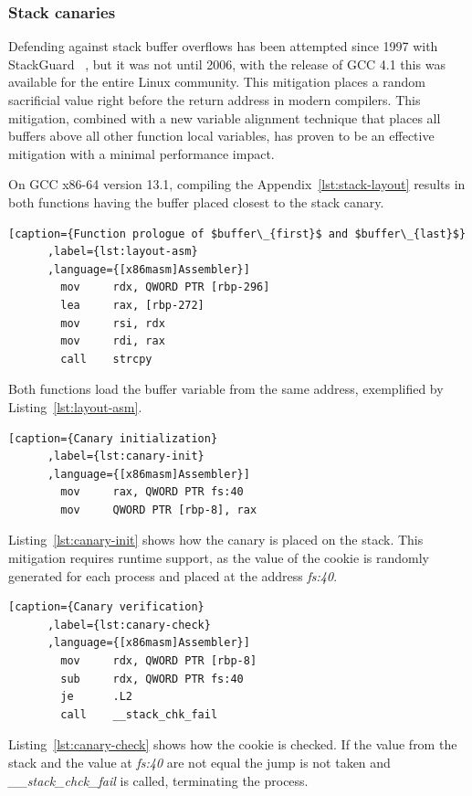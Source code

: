 \documentclass{article}
\begin{document}
\subsubsection{Stack canaries}
Defending against stack buffer overflows has been attempted since 1997 with StackGuard ~\cite{stackguard}, but it was not until 2006, with the release of GCC 4.1 this was available for the entire Linux community. This mitigation places a random sacrificial value right before the return address in modern compilers. This mitigation, combined with a new variable alignment technique that places all buffers above all other function local variables, has proven to be an effective mitigation with a minimal performance impact.

On GCC x86-64 version 13.1, compiling the Appendix~\ref{lst:stack-layout} results in both functions having the buffer
placed closest to the stack canary.

\begin{lstlisting}[caption={Function prologue of $buffer\_{first}$ and $buffer\_{last}$}
      ,label={lst:layout-asm}
      ,language={[x86masm]Assembler}]
        mov     rdx, QWORD PTR [rbp-296]
        lea     rax, [rbp-272]
        mov     rsi, rdx
        mov     rdi, rax
        call    strcpy
\end{lstlisting}

Both functions load the buffer variable from the same address, exemplified by Listing~\ref{lst:layout-asm}.

\begin{lstlisting}[caption={Canary initialization}
      ,label={lst:canary-init}
      ,language={[x86masm]Assembler}]
        mov     rax, QWORD PTR fs:40
        mov     QWORD PTR [rbp-8], rax
\end{lstlisting}

Listing~\ref{lst:canary-init} shows how the canary is placed on the stack. This mitigation requires runtime support, as the value of the cookie is randomly generated for each process and placed at the address \emph{fs:40}.

\begin{lstlisting}[caption={Canary verification}
      ,label={lst:canary-check}
      ,language={[x86masm]Assembler}]
        mov     rdx, QWORD PTR [rbp-8]
        sub     rdx, QWORD PTR fs:40
        je      .L2
        call    __stack_chk_fail
\end{lstlisting}

Listing~\ref{lst:canary-check} shows how the cookie is checked. If the value from the stack and the value at \emph{fs:40} are not equal the jump is not taken and \emph{\_\_stack\_chck\_fail} is called, terminating the process.
\end{document}
